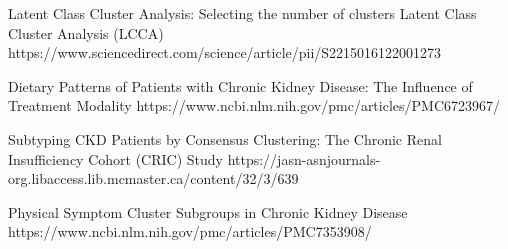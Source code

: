 
Latent Class Cluster Analysis: Selecting the number of clusters
Latent Class Cluster Analysis (LCCA) 
https://www.sciencedirect.com/science/article/pii/S2215016122001273

Dietary Patterns of Patients with Chronic Kidney Disease: The Influence of Treatment Modality
https://www.ncbi.nlm.nih.gov/pmc/articles/PMC6723967/


Subtyping CKD Patients by Consensus Clustering: The Chronic Renal Insufficiency Cohort (CRIC) Study
https://jasn-asnjournals-org.libaccess.lib.mcmaster.ca/content/32/3/639

Physical Symptom Cluster Subgroups in Chronic Kidney Disease
https://www.ncbi.nlm.nih.gov/pmc/articles/PMC7353908/

